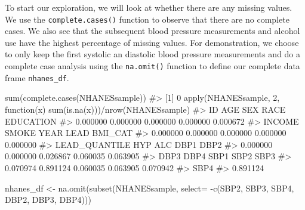 \documentclass[
  letterpaper,
]{krantz}
\makeatletter
\newenvironment{Shaded}{\begin{snugshade}}{\end{snugshade}}
\newcommand{\AttributeTok}[1]{\textcolor[rgb]{0.40,0.45,0.13}{#1}}
\newcommand{\CommentTok}[1]{\textcolor[rgb]{0.37,0.37,0.37}{#1}}
\newcommand{\ControlFlowTok}[1]{\textcolor[rgb]{0.00,0.23,0.31}{#1}}
\newcommand{\DecValTok}[1]{\textcolor[rgb]{0.68,0.00,0.00}{#1}}
\newcommand{\FunctionTok}[1]{\textcolor[rgb]{0.28,0.35,0.67}{#1}}
\newcommand{\NormalTok}[1]{\textcolor[rgb]{0.00,0.23,0.31}{#1}}
\newcommand{\OtherTok}[1]{\textcolor[rgb]{0.00,0.23,0.31}{#1}}
\newcommand{\SpecialCharTok}[1]{\textcolor[rgb]{0.37,0.37,0.37}{#1}}
\newenvironment{kframe}{%
\medskip{}
\setlength{\fboxsep}{.8em}
 \def\at@end@of@kframe{}%
 \ifinner\ifhmode%
  \def\at@end@of@kframe{\end{minipage}}%
  \begin{minipage}{\columnwidth}%
 \fi\fi%
 \def\FrameCommand##1{\hskip\@totalleftmargin \hskip-\fboxsep
 \colorbox{shadecolor}{##1}\hskip-\fboxsep
     \hskip-\linewidth \hskip-\@totalleftmargin \hskip\columnwidth}%
 \MakeFramed {\advance\hsize-\width
   \@totalleftmargin\z@ \linewidth\hsize
   \@setminipage}}%
 {\par\unskip\endMakeFramed%
 \at@end@of@kframe}
\renewenvironment{Shaded}{\begin{kframe}}{\end{kframe}}
\makeatother
\begin{document}
To start our exploration, we will look at whether there are any missing
values. We use the \texttt{complete.cases()} function to observe that
there are no complete cases. We also see that the subsequent blood
pressure measurements and alcohol use have the highest percentage of
missing values. For demonstration, we choose to only keep the first
systolic an diastolic blood pressure measurements and do a complete case
analysis using the \texttt{na.omit()} function to define our complete
data frame \texttt{nhanes\_df}.

\begin{Shaded}
\begin{Highlighting}[]
\FunctionTok{sum}\NormalTok{(}\FunctionTok{complete.cases}\NormalTok{(NHANESsample))}
\CommentTok{\#\textgreater{} [1] 0}
\FunctionTok{apply}\NormalTok{(NHANESsample, }\DecValTok{2}\NormalTok{, }\ControlFlowTok{function}\NormalTok{(x) }\FunctionTok{sum}\NormalTok{(}\FunctionTok{is.na}\NormalTok{(x)))}\SpecialCharTok{/}\FunctionTok{nrow}\NormalTok{(NHANESsample)}
\CommentTok{\#\textgreater{}            ID           AGE           SEX          RACE     EDUCATION }
\CommentTok{\#\textgreater{}      0.000000      0.000000      0.000000      0.000000      0.000672 }
\CommentTok{\#\textgreater{}        INCOME         SMOKE          YEAR          LEAD       BMI\_CAT }
\CommentTok{\#\textgreater{}      0.000000      0.000000      0.000000      0.000000      0.000000 }
\CommentTok{\#\textgreater{} LEAD\_QUANTILE           HYP           ALC          DBP1          DBP2 }
\CommentTok{\#\textgreater{}      0.000000      0.000000      0.026867      0.060035      0.063905 }
\CommentTok{\#\textgreater{}          DBP3          DBP4          SBP1          SBP2          SBP3 }
\CommentTok{\#\textgreater{}      0.070974      0.891124      0.060035      0.063905      0.070942 }
\CommentTok{\#\textgreater{}          SBP4 }
\CommentTok{\#\textgreater{}      0.891124}
\end{Highlighting}
\end{Shaded}

\begin{Shaded}
\begin{Highlighting}[]
\NormalTok{nhanes\_df }\OtherTok{\textless{}{-}} \FunctionTok{na.omit}\NormalTok{(}\FunctionTok{subset}\NormalTok{(NHANESsample, }
                            \AttributeTok{select=} \SpecialCharTok{{-}}\FunctionTok{c}\NormalTok{(SBP2, SBP3, SBP4, DBP2, DBP3, DBP4)))}
\end{Highlighting}
\end{Shaded}
\end{document}
